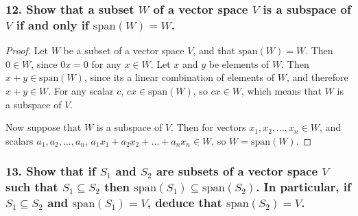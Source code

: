 \documentclass{article}
\begin{document}
\subsubsection*{12. Show that a subset $W$ of a vector space $V$ is a subspace of $V$ if and only if $\text{span}(W) = W$.}
\begin{proof}
	Let $W$ be a subset of a vector space $V$, and that $\text{span}(W) = W$. Then $0 \in W$, since $0x = 0$ for any $x \in W$. Let $x$ and $y$ be elements of $W$. Then $x + y \in \text{span}(W)$, since its a linear combination of elements of $W$, and therefore $x + y \in W$. For any scalar $c$, $cx \in \text{span}(W)$, so $cx \in W$, which means that $W$ is a subspace of $V$.

	Now suppose that $W$ is a subspace of $V$. Then for vectors $x_1, x_2, \dots, x_n \in W$, and scalars $a_1, a_2, \dots, a_n$, $a_1x_1 + a_2x_2 + \dots + a_nx_n \in W$, so $W = \text{span}(W)$.
\end{proof}

\subsubsection*{13. Show that if $S_1$ and $S_2$ are subsets of a vector space $V$ such that $S_1 \subseteq S_2$ then $\text{span}(S_1) \subseteq \text{span}(S_2)$. In particular, if $S_1 \subseteq S_2$ and $\text{span}(S_1) = V$, deduce that $\text{span}(S_2) = V$.}
\end{document}

